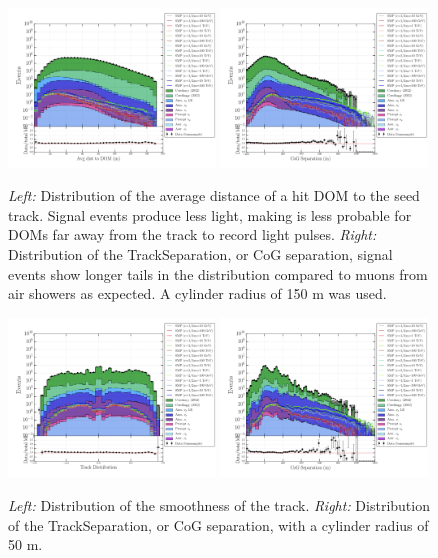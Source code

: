 \begin{figure}
\centering
\includegraphics[width = 0.49\textwidth]{chapter8/img/1D_stack_avdistdom_150.png}
\includegraphics[width = 0.49\textwidth]{chapter8/img/1D_stack_trackseparation_150.png}
\caption{\textit{Left: }Distribution of the average distance of a hit DOM to the seed track. Signal events produce less light, making is less probable for DOMs far away from the track to record light pulses. \textit{Right: }Distribution of the TrackSeparation, or CoG separation, signal events show longer tails in the distribution compared to muons from air showers as expected. A cylinder radius of 150 m was used.}
\label{fig:commonvariables2}
\end{figure}

\begin{figure}
\centering
\includegraphics[width = 0.49\textwidth]{chapter8/img/1D_stack_trackdistribution_50.png}
\includegraphics[width = 0.49\textwidth]{chapter8/img/1D_stack_trackseparation_50.png}
\caption{\textit{Left: }Distribution of the smoothness of the track. \textit{Right: }Distribution of the TrackSeparation, or CoG separation, with a cylinder radius of 50 m.}
\label{fig:commonvariables3}
\end{figure}

